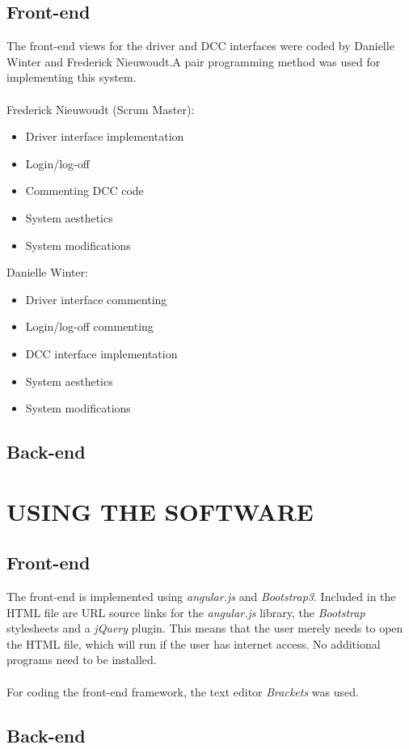 \documentclass[10pt,twocolumn]{witseiepaper}
\begin{document}
\subsection{Front-end}
The front-end views for the driver and DCC interfaces were coded by Danielle Winter and Frederick Nieuwoudt.A pair programming method was used for implementing this system.\\ \\
Frederick Nieuwoudt (Scrum Master):
\begin{itemize}
\item Driver interface implementation
\item Login/log-off 
\item Commenting DCC code
\item System aesthetics
\item System modifications
\end{itemize}
Danielle Winter:
\begin{itemize}
\item Driver interface commenting
\item Login/log-off commenting
\item DCC interface implementation
\item System aesthetics
\item System modifications
\end{itemize}

\subsection{Back-end}


\section{USING THE SOFTWARE}
\subsection{Front-end}
The front-end is implemented using \textit{angular.js} and \textit{Bootstrap3}. Included in the HTML file are URL source links for the \textit{angular.js} library, the \textit{Bootstrap} stylesheets and a \textit{jQuery} plugin. This means that the user merely needs to open the HTML file, which will run if the user has internet access. No additional programs need to be installed.\\ \\
For coding the front-end framework, the text editor \textit{Brackets} was used.

\subsection{Back-end}


%


\end{document}
